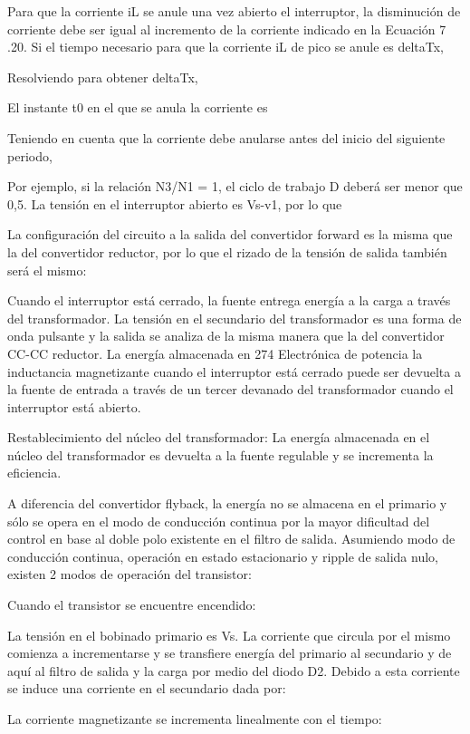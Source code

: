 Para que la corriente iL se anule una vez abierto el interruptor, la disminución de corriente
debe ser igual al incremento de la corriente indicado en la Ecuación 7 .20. Si el tiempo necesario
para que la corriente iL de pico se anule es deltaTx, 


Resolviendo para obtener deltaTx, 


El instante t0 en el que se anula la corriente es


Teniendo en cuenta que la corriente debe anularse antes del inicio del siguiente periodo,


Por ejemplo, si la relación N3/N1 = 1, el ciclo de trabajo D deberá ser menor que 0,5. La tensión
en el interruptor abierto es Vs-v1, por lo que


La configuración del circuito a la salida del convertidor forward es la misma que la del convertidor
reductor, por lo que el rizado de la tensión de salida también será el mismo:


Cuando el interruptor está cerrado, la fuente entrega energía a la carga a través del transformador.
La tensión en el secundario del transformador es una forma de onda pulsante y la salida se
analiza de la misma manera que la del convertidor CC-CC reductor. La energía almacenada en
274 Electrónica de potencia
la inductancia magnetizante cuando el interruptor está cerrado puede ser devuelta a la fuente de
entrada a través de un tercer devanado del transformador cuando el interruptor está abierto.

Restablecimiento del núcleo del transformador:
La energía almacenada en el núcleo del transformador es devuelta a la fuente regulable y se incrementa la eficiencia. 

A diferencia del convertidor flyback, la energía no se almacena en el primario y sólo se opera 
en el modo de conducción continua por la mayor dificultad del control en base al doble polo existente en el filtro de salida. 
Asumiendo modo de conducción continua, operación en estado estacionario y ripple de salida nulo, 
existen 2 modos de operación del transistor:

Cuando el transistor se encuentre encendido:

La tensión en el bobinado primario es Vs. La corriente que circula por el mismo comienza a incrementarse 
y se transfiere energía del primario al secundario y de aquí al filtro de salida y la carga por medio del diodo D2. 
Debido a esta corriente se induce una corriente en el secundario dada por:

La corriente magnetizante se incrementa linealmente con el tiempo:

